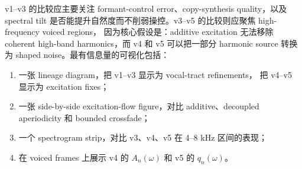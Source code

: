 \documentclass[11pt,fontset=none]{ctexart}
\newcommand{\ap}{A}
\begin{document}
v1--v3 的比较应主要关注 formant-control error、copy-synthesis quality，以及 spectral tilt
是否能提升自然度而不削弱操控。v3--v5 的比较则应聚焦 high-frequency voiced regions，
因为核心假设是：additive excitation 无法移除 coherent high-band harmonics，而 v4 和 v5
可以把一部分 harmonic source 转换为 shaped noise。最有信息量的可视化包括：
\begin{enumerate}
  \item 一张 lineage diagram，把 v1--v3 显示为 vocal-tract refinements，
        把 v4--v5 显示为 excitation fixes；
  \item 一张 side-by-side excitation-flow figure，对比 additive、decoupled aperiodicity
        和 bounded crossfade；
  \item 一个 spectrogram strip，对比 v3、v4、v5 在 4--8 kHz 区间的表现；
  \item 在 voiced frames 上展示 v4 的 $\ap_n(\omega)$ 和 v5 的 $q_n(\omega)$。
\end{enumerate}
\end{document}
